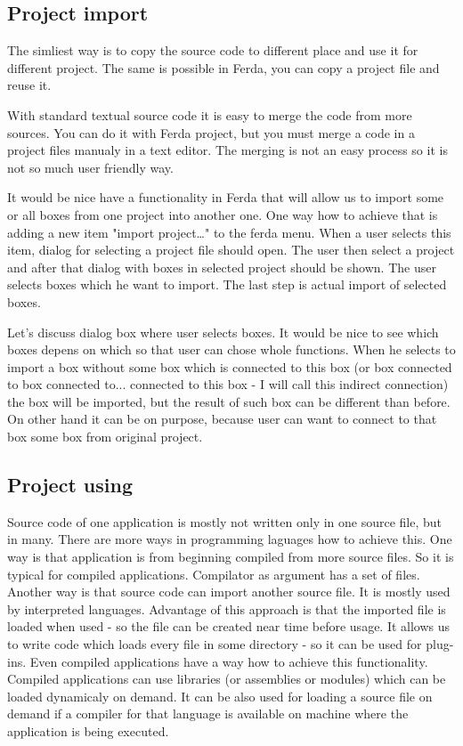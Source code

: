 \documentclass{article}
\begin{document}
\subsection{Project import}
The simliest way is to copy the source code to different place and use it for different project. The same is possible in Ferda, you can copy a project file and reuse it.

With standard textual source code it is easy to merge the code from more sources. You can do it with Ferda project, but you must merge a code in a project files manualy in a text editor. The merging is not an easy process so it is not so much user friendly way.

It would be nice have a functionality in Ferda that will allow us to import some or all boxes from one project into another one. One way how to achieve that is adding a new item "import project\dots" to the ferda menu. When a user selects this item, dialog for selecting a project file should open. The user then select a project and after that dialog with boxes in selected project should be shown. The user selects boxes which he want to import. The last step is actual import of selected boxes.

Let's discuss dialog box where user selects boxes. It would be nice to see which boxes depens on which so that user can chose whole functions. When he selects to import a box without some box which is connected to this box (or box connected to box connected to... connected to this box - I will call this indirect connection) the box will be imported, but the result of such box can be different than before. On other hand it can be on purpose, because user can want to connect to that box some box from original project.

\subsection{Project using}
Source code of one application is mostly not written only in one source file, but in many. There are more ways in programming laguages how to achieve this. One way is that application is from beginning compiled from more source files. So it is typical for compiled applications. Compilator as argument has a set of files. Another way is that source code can import another source file. It is mostly used by interpreted languages. Advantage of this approach is that the imported file is loaded when used - so the file can be created near time before usage. It allows us to write code which loads every file in some directory - so it can be used for plug-ins. Even compiled applications have a way how to achieve this functionality. Compiled applications can use libraries (or assemblies or modules) which can be loaded dynamicaly on demand. It can be also used for loading a source file on demand if a compiler for that language is available on machine where the application is being executed.
\end{document}
